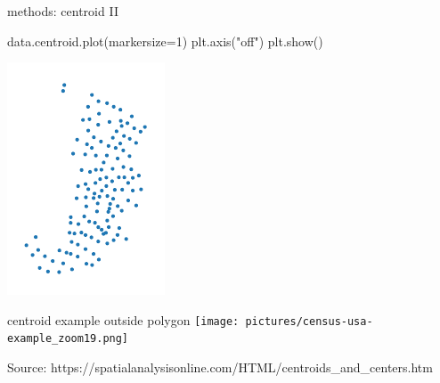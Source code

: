 \documentclass[
  ignorenonframetext,
]{beamer}
\newenvironment{Shaded}{\begin{snugshade}}{\end{snugshade}}
\newcommand{\DecValTok}[1]{\textcolor[rgb]{0.68,0.00,0.00}{#1}}
\newcommand{\NormalTok}[1]{\textcolor[rgb]{0.00,0.23,0.31}{#1}}
\newcommand{\OperatorTok}[1]{\textcolor[rgb]{0.37,0.37,0.37}{#1}}
\newcommand{\StringTok}[1]{\textcolor[rgb]{0.13,0.47,0.30}{#1}}
\begin{document}
\begin{frame}[fragile]{methods: centroid II}
\label{methods-centroid-ii}
\begin{Shaded}
\begin{Highlighting}[]
\NormalTok{data.centroid.plot(markersize}\OperatorTok{=}\DecValTok{1}\NormalTok{)}
\NormalTok{plt.axis(}\StringTok{"off"}\NormalTok{)}
\NormalTok{plt.show()}
\end{Highlighting}
\end{Shaded}

\includegraphics{spatial_2_files/figure-beamer/cell-18-output-1.pdf}
\end{frame}

\begin{frame}{centroid example outside polygon}
\label{centroid-example-outside-polygon}
\texttt{[image: pictures/census-usa-example\_zoom19.png]}

Source:
https://spatialanalysisonline.com/HTML/centroids\_and\_centers.htm
\end{frame}
\end{document}
